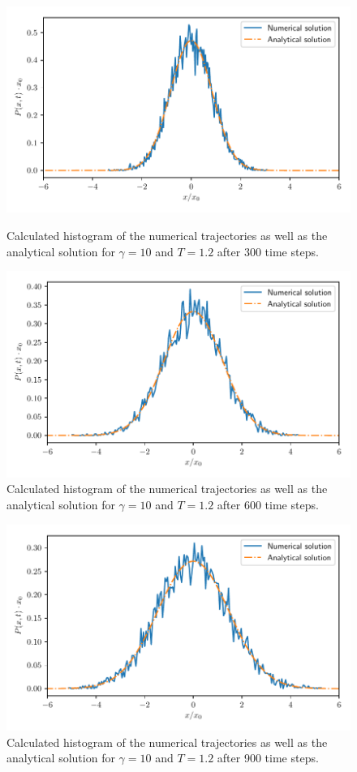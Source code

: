 \documentclass[a4paper,10pt,bibtotoc]{scrartcl}
\begin{document}
\begin{figure}[H]
	\centering
	\includegraphics[width=\linewidth]{diffusion300.pdf}
	\caption{Calculated histogram of the numerical trajectories as well as the analytical solution for $\gamma = 10$ and $T=1.2$ after 300 time steps.}
	\label{fig:figdiffusion1}
	\includegraphics[width=\linewidth]{diffusion600.pdf}
	\caption{Calculated histogram of the numerical trajectories as well as the analytical solution for $\gamma = 10$ and $T=1.2$ after 600 time steps.}
	\label{fig:figdiffusion2}
\end{figure}

\begin{figure}[H]
	\centering
	\includegraphics[width=\linewidth]{diffusion900.pdf}
	\caption{Calculated histogram of the numerical trajectories as well as the analytical solution for $\gamma = 10$ and $T=1.2$ after 900 time steps.}
	\label{fig:figdiffusion3}
\end{figure}
\end{document}

